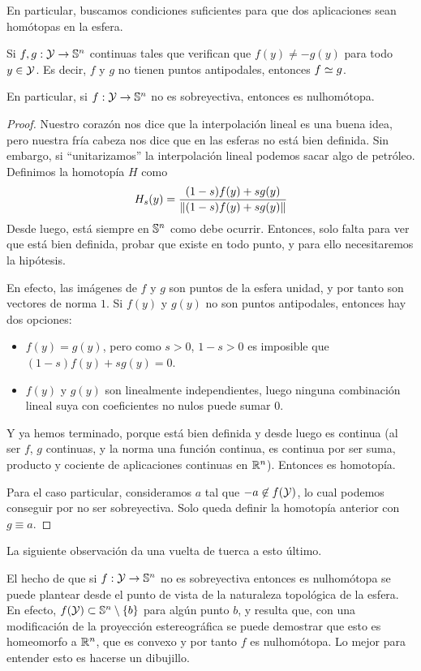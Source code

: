 En particular, buscamos condiciones suficientes para que dos aplicaciones sean homótopas en la esfera.
\begin{prop}
	\label{grf_prop_esfera_no_sobre_nulhomotopa}
	Si $f,g:\mathcal{Y}\to\mathbb{S}^n$ continuas tales que verifican que $f(y)\neq -g(y)$ para todo $y\in\mathcal{Y}$. Es decir, $f$ y $g$ no tienen puntos antipodales, entonces $f\mathrel{\smash{\underset{}{\simeq}}} g$.
	
	En particular, si $f:\mathcal{Y}\to\mathbb{S}^n$ no es sobreyectiva, entonces es nulhomótopa.
\end{prop}
\begin{proof}
	Nuestro corazón nos dice que la interpolación lineal es una buena idea, pero nuestra fría cabeza nos dice que en las esferas no está bien definida. Sin embargo, si ``unitarizamos'' la interpolación lineal podemos sacar algo de petróleo. Definimos la homotopía $H$ como
	\[H_s(y)=\frac{(1-s)f(y)+sg(y)}{\lVert(1-s)f(y)+sg(y)\rVert}\]
	Desde luego, está siempre en $\mathbb{S}^n$ como debe ocurrir. Entonces, solo falta para ver que está bien definida, probar que existe en todo punto, y para ello necesitaremos la hipótesis.
	
	En efecto, las imágenes de $f$ y $g$ son puntos de la esfera unidad, y por tanto son vectores de norma $1$. Si $f(y)$ y $g(y)$ no son puntos antipodales, entonces hay dos opciones:
	\begin{itemize}
		\item $f(y)=g(y)$, pero como $s>0$, $1-s>0$ es imposible que $(1-s)f(y)+sg(y) = 0$.
		\item $f(y)$ y $g(y)$ son linealmente independientes, luego ninguna combinación lineal suya con coeficientes no nulos puede sumar $0$.
	\end{itemize}
	
	Y ya hemos terminado, porque está bien definida y desde luego es continua (al ser $f$, $g$ continuas, y la norma una función continua, es continua por ser suma, producto y cociente de aplicaciones continuas en $\mathbb{R}^n$). Entonces es homotopía.
	
	Para el caso particular, consideramos $a$ tal que $-a\not\in f(\mathcal{Y})$, lo cual podemos conseguir por no ser sobreyectiva. Solo queda definir la homotopía anterior con $g\equiv a$.
\end{proof}
La siguiente observación da una vuelta de tuerca a esto último.
\begin{obs}
	El hecho de que si $f:\mathcal{Y}\to\mathbb{S}^n$ no es sobreyectiva entonces es nulhomótopa se puede plantear desde el punto de vista de la naturaleza topológica de la esfera. En efecto, $f(\mathcal{Y})\subset\mathbb{S}^n\setminus\{b\}$ para algún punto $b$, y resulta que, con una modificación de la proyección estereográfica se puede demostrar que esto es homeomorfo a $\mathbb{R}^n$, que es convexo y por tanto $f$ es nulhomótopa. Lo mejor para entender esto es hacerse un dibujillo.
\end{obs}

